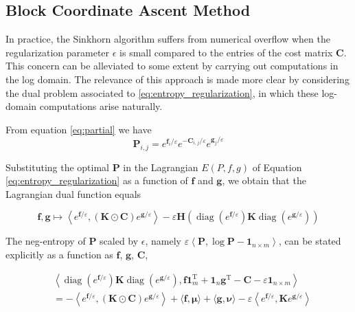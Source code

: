 \subsection{Block Coordinate Ascent Method}
In practice, the Sinkhorn algorithm suffers from numerical
overflow when the regularization parameter $\epsilon$ is small compared to the entries of the cost
matrix $\mathbf{C}$. This concern can be alleviated to some extent by carrying out computations
in the log domain. The relevance of this approach is made more clear by considering
the dual problem associated to \ref{eq:entropy_regularization}, in which these log-domain computations arise
naturally.

From equation \ref{eq:partial} we have
\begin{equation}
  \mathbf{P}_{i, j}=e^{\mathbf{f}_{i} / \varepsilon} e^{-\mathbf{C}_{i, j} / \varepsilon} e^{\mathbf{g}_{j} / \varepsilon}
\end{equation}

Substituting the optimal $\mathbf{P}$ in the Lagrangian $E(P,f, g)$ of Equation \ref{eq:entropy_regularization} as a function of $\mathbf{f}$ and $\mathbf{g}$, we obtain that the Lagrangian dual function equals

\begin{equation}
  \label{eq:fg}
  \mathbf{f}, \mathbf{g} \mapsto\left\langle e^{\mathbf{f} / \varepsilon},(\mathbf{K} \odot \mathbf{C}) e^{\mathbf{g} / \varepsilon}\right\rangle-\varepsilon \mathbf{H}\left(\operatorname{diag}\left(e^{\mathbf{f} / \varepsilon}\right) \mathbf{K} \operatorname{diag}\left(e^{\mathbf{g} / \varepsilon}\right)\right)
\end{equation}

The neg-entropy of $\mathbf{P}$ scaled by $\epsilon$, namely $\varepsilon\left\langle\mathbf{P}, \log \mathbf{P}-\mathbf{1}_{n \times m}\right\rangle$, can be stated explicitly as a function as $\mathbf{f}$, $\mathbf{g}$, $\mathbf{C}$, 

\begin{equation}
  \begin{aligned}
    &\left\langle\operatorname{diag}\left(e^{\mathbf{f} / \varepsilon}\right) \mathbf{K} \operatorname{diag}\left(e^{\mathbf{g} / \varepsilon}\right), \mathbf{f} \mathbf{1}_{m}^{\mathrm{T}}+\mathbf{1}_{n} \mathbf{g}^{\mathrm{T}}-\mathbf{C}-\varepsilon \mathbf{1}_{n \times m}\right\rangle\\
    &=-\left\langle e^{\mathbf{f} / \varepsilon},(\mathbf{K} \odot \mathbf{C}) e^{\mathbf{g} / \varepsilon}\right\rangle+\langle\mathbf{f}, \mathbf{\mu}\rangle+\langle\mathbf{g}, \mathbf{\nu}\rangle-\varepsilon\left\langle e^{\mathbf{f} / \varepsilon}, \mathbf{K} e^{\mathbf{g} / \varepsilon}\right\rangle
    \end{aligned}
\end{equation}


